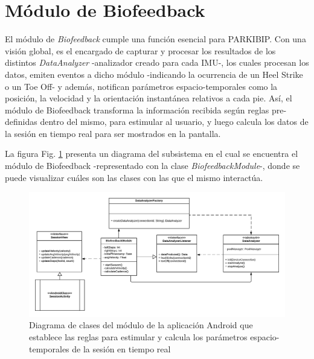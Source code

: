 \newpage

\section{Módulo de Biofeedback}

El módulo de \textit{Biofeedback} cumple una función esencial para PARKIBIP. Con una visión global, es el encargado de capturar y procesar los resultados de los distintos \textit{DataAnalyzer} -analizador creado para cada IMU-, los cuales procesan los datos, emiten eventos a dicho módulo -indicando la ocurrencia de un Heel Strike o un Toe Off- y además, notifican parámetros espacio-temporales como la posición, la velocidad y la orientación instantánea relativos a cada pie.  Así, el módulo de Biofeedback transforma la información recibida según reglas pre-definidas dentro del mismo, para estimular al usuario,  y luego calcula los datos de la sesión en tiempo real para ser mostrados en la pantalla. 

La figura Fig. \ref{FIG:biofeedback-module-class-diagram} presenta un diagrama del subsistema en el cual se encuentra el módulo de Biofeedback -representado con la clase \textit{BiofeedbackModule}-, donde se puede visualizar cuáles son las clases con las que el mismo interactúa.

\begin{figure}[H]
    \hspace*{-3.5cm}%
    \includegraphics[clip,width=1.4 \columnwidth]{TESIS/imagenes/chap05/biofeedback-module-design.png}   
    \caption{Diagrama de clases del módulo de la aplicación Android que establece las reglas para estimular y calcula los parámetros espacio-temporales de la sesión en tiempo real}
    \label{FIG:biofeedback-module-class-diagram}
\end{figure}

